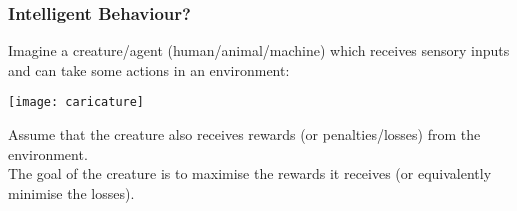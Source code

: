 

\newcommand{\vv}{{\mathbf v}}
\newcommand{\B}{{\cal B}}
\newcommand{\cP}{{\mathcal P}}
\newcommand{\cR}{{\mathcal R}}
\newcommand{\xx}{{\mathbf x}}
\newcommand{\uu}{{\mathbf u}}




\begin{frame}
\frametitle{Intelligent Behaviour?}

Imagine a creature/agent (human/animal/machine) which receives sensory
inputs and can take some actions in an environment:

\centerline{\texttt{[image: caricature]}}

Assume that the creature also receives rewards (or penalties/losses)
from the environment.\\

The goal of the creature is to maximise the rewards it receives (or
equivalently minimise the losses). \\

\end{frame}

